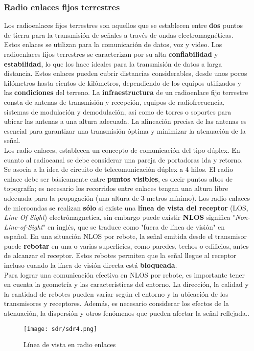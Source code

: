 \documentclass[
	12pt, %
	fleqn, %
	a4paper, %
	oneside, %
]{LegrandOrangeBook}
\begin{document}
\subsubsection{Radio enlaces fijos terrestres}
Los radioenlaces fijos terrestres son aquellos que se establecen entre \textbf{dos} puntos de tierra para la transmisión de señales a través de ondas electromagnéticas. Estos enlaces se utilizan para la comunicación de datos, voz y video. Los radioenlaces fijos terrestres se caracterizan por su alta \textbf{confiabilidad} y \textbf{estabilidad}, lo que los hace ideales para la transmisión de datos a larga distancia. Estos enlaces pueden cubrir distancias considerables, desde unos pocos kilómetros hasta cientos de kilómetros, dependiendo de los equipos utilizados y las \textbf{condiciones} del terreno. La \textbf{infraestructura} de un radioenlace fijo terrestre consta de antenas de transmisión y recepción, equipos de radiofrecuencia, sistemas de modulación y demodulación, así como de torres o soportes para ubicar las antenas a una altura adecuada. La alineación precisa de las antenas es esencial para garantizar una transmisión óptima y minimizar la atenuación de la señal.\\
Los radio enlaces, establecen un concepto de comunicación del tipo
dúplex. En cuanto al radiocanal se debe considerar una pareja de portadoras ida y retorno. Se asocia a la idea de circuito de telecomunicación dúplex a 4 hilos. El radio enlace debe ser básicamente entre \textbf{puntos visibles}, es decir puntos altos de topografía; es necesario los recorridos entre enlaces tengan una altura libre
adecuada para la propagación (una altura de 3 metros mínimo). Los radio enlaces de microondas se realizan \textbf{sólo} si existe una \textbf{línea de vista del receptor} (LOS, \textit{Line Of Sight}) electrómagnetica, sin embargo puede existir \textbf{NLOS} significa "\textit{Non-Line-of-Sight}" en inglés, que se traduce como "fuera de línea de visión" en español. En una situación NLOS por rebote, la señal emitida desde el transmisor puede \textbf{rebotar} en una o varias superficies, como paredes, techos o edificios, antes de alcanzar el receptor. Estos rebotes permiten que la señal llegue al receptor incluso cuando la línea de visión directa está \textbf{bloqueada}.\\
Para lograr una comunicación efectiva en NLOS por rebote, es importante tener en cuenta la geometría y las características del entorno. La dirección, la calidad y la cantidad de rebotes pueden variar según el entorno y la ubicación de los transmisores y receptores. Además, es necesario considerar los efectos de la atenuación, la dispersión y otros fenómenos que pueden afectar la señal reflejada..
\begin{figure}[H]
\centering
\texttt{[image: sdr/sdr4.png]}
\caption{Línea de vista en radio enlaces}
\end{figure}
\end{document}
